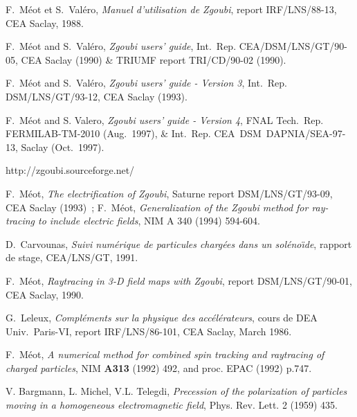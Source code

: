 


\pagestyle{myheadings}

\begin{thebibliography}{99}  %

 F.~M\'eot et S.~Val\'ero, \textsl{Manuel
d'utilisation de  Zgoubi}, report IRF/LNS/88-13, CEA Saclay, 1988.  

F.~M\'eot and S.~Val\'ero, \textsl{Zgoubi users' guide}, 
Int.~Rep. CEA/DSM/LNS/GT/90-05, CEA Saclay (1990) \& TRIUMF report TRI/CD/90-02 (1990). 

 F.~M\'eot and S.~Val\'ero, \textsl{Zgoubi users' guide - Version 3}, 
Int.~Rep. DSM/LNS/GT/93-12, CEA Saclay (1993). 

F.~M\'eot and S. Valero,  
\textsl{Zgoubi users' guide - Version 4}, 
FNAL Tech.~Rep. FERMILAB-TM-2010 (Aug.~1997),  \& 
Int.~Rep. CEA~DSM~DAPNIA/SEA-97-13, Saclay (Oct.~1997). 

 http://zgoubi.sourceforge.net/ 

 F.~M\'eot, \textsl{The electrification of Zgoubi}, 
Saturne report DSM/LNS/GT/93-09, CEA Saclay (1993)~; F.~M\'eot, \textsl{
Generalization of the Zgoubi method for ray-tracing to include electric 
fields}, NIM A 340 (1994) 594-604. 

 D.~Carvounas, \textsl{Suivi num\'erique de particules charg\'ees 
dans un sol\'eno\"\i de}, rapport de stage, CEA/LNS/GT, 1991. 

 F.~M\'eot, \textsl{Raytracing in 3-D field maps with Zgoubi}, 
report  DSM/LNS/GT/90-01, CEA Saclay, 1990.

 G.~Leleux, \textsl{Compl\'ements sur la physique des acc\'el\'erateurs}, 
cours de DEA Univ.~Paris-VI,  report  IRF/LNS/86-101, CEA Saclay, March 1986. 

 F.~M\'eot, \textsl{A numerical method for combined spin tracking and 
raytracing of charged particles}, 
NIM \textbf{A313} (1992) 492, and proc. EPAC (1992) p.747. 

 V. Bargmann, L. Michel, V.L. Telegdi,
\textsl{Precession of the polarization of particles moving in a homogeneous electromagnetic field}, 
Phys. Rev. Lett. 2 (1959) 435.


\end{thebibliography}
